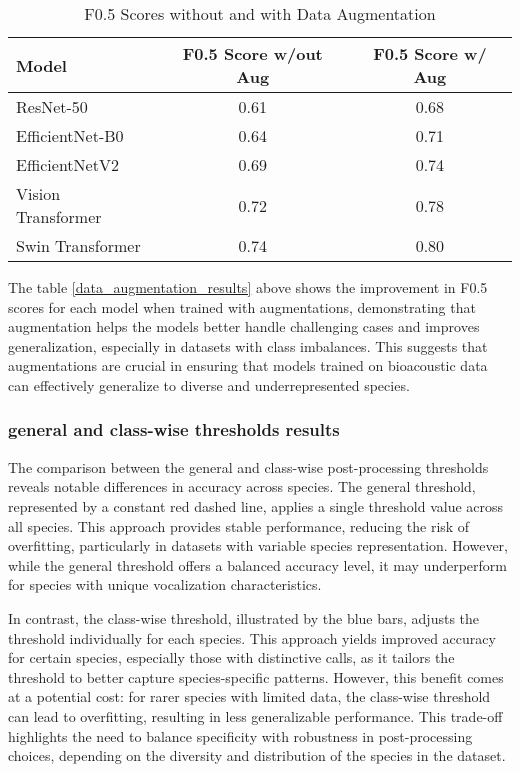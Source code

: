 \begin{table}[h]  
\begin{tabular}{|l|c|c|}
\hline 
\textbf{Model} & \textbf{F0.5 Score w/out Aug} & \textbf{F0.5 Score w/ Aug} \\
\hline 
ResNet-50 & 0.61 & 0.68 \\
EfficientNet-B0 & 0.64 & 0.71 \\
EfficientNetV2 & 0.69 & 0.74 \\
Vision Transformer & 0.72 & 0.78 \\
Swin Transformer & 0.74 & 0.80 \\
\hline 
\end{tabular} 
\caption{F0.5 Scores without and with Data Augmentation} 
\label{tab:data_augmentation_results}
\end{table}

The table \ref{data_augmentation_results} above shows the improvement in F0.5 scores for each model when trained with augmentations, demonstrating that augmentation helps the models better handle challenging cases and improves generalization, especially in datasets with class imbalances. This suggests that augmentations are crucial in ensuring that models trained on bioacoustic data can effectively generalize to diverse and underrepresented species.

\subsubsection{general and class-wise thresholds results}

The comparison between the general and class-wise post-processing thresholds reveals notable differences in accuracy across species. The general threshold, represented by a constant red dashed line, applies a single threshold value across all species. This approach provides stable performance, reducing the risk of overfitting, particularly in datasets with variable species representation. However, while the general threshold offers a balanced accuracy level, it may underperform for species with unique vocalization characteristics.

In contrast, the class-wise threshold, illustrated by the blue bars, adjusts the threshold individually for each species. This approach yields improved accuracy for certain species, especially those with distinctive calls, as it tailors the threshold to better capture species-specific patterns. However, this benefit comes at a potential cost: for rarer species with limited data, the class-wise threshold can lead to overfitting, resulting in less generalizable performance. This trade-off highlights the need to balance specificity with robustness in post-processing choices, depending on the diversity and distribution of the species in the dataset.

